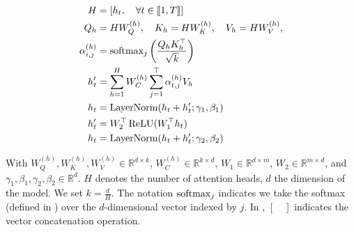 \begin{align}
H &= \left[h_t, \quad \forall t \in \llbracket 1, T \rrbracket\right] \labeq{transformer:mha-first}\\
Q_h & = H W_Q^{(h)}, \quad K_h = H W_K^{(h)}, \quad V_h = H W_V^{(h)}, \\
\alpha^{(h)}_{i,j} &= \softmax_j \left(\frac{Q_h K_h^{\top}}{\sqrt{k}} \right) \labeq{transformer:alpha}\\
h'_t &= \sum_{h=1}^HW^{(h)}_{C}\sum_{j=1}^{\top}\alpha^{(h)}_{t,j}V_h \labeq{transformer:mha-last}\\
h_t &= \textrm{LayerNorm}(h_t + h'_t; \gamma_1, \beta_1) \labeq{transformer:ffn-start}\\
h'_t &= W_2^{\top}\relu(W_1^{\top}h_t)\\
h_t &= \textrm{LayerNorm}(h_t + h'_t; \gamma_2, \beta_2) \labeq{transformer:ffn-last}
\end{align}

With $W_Q^{(h)}, W_K^{(h)}, W_V^{(h)} \in \mathbb{R}^{d\times k}$, $W^{(h)}_{C} \in \mathbb{R}^{k\times d}$, $W_1 \in \mathbb{R}^{d \times m}$, $W_2 \in \mathbb{R}^{m \times d}$, and $\gamma_1, \beta_1, \gamma_2, \beta_2 \in \mathbb{R}^d$. $H$ denotes the number of attention heads, $d$ the dimension of the model. We set $k = \frac{d}{H}$. The notation $\operatorname{softmax}_j$ indicates we take the softmax (defined in ) over the $d$-dimensional
vector indexed by $j$. In , $\left[ \quad \right]$ indicates the vector concatenation operation.


